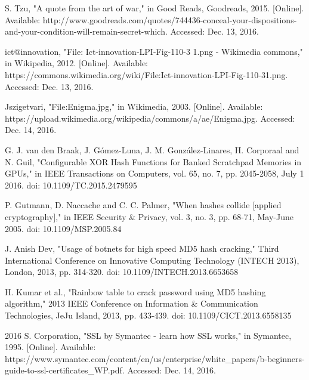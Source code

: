 \documentclass[journal]{IEEEtran}
\begin{document}
%
%
%
\begin{thebibliography}{1}


S. Tzu, "A quote from the art of war," in Good Reads, Goodreads, 2015. [Online]. Available: http://www.goodreads.com/quotes/744436-conceal-your-dispositions-and-your-condition-will-remain-secret-which. Accessed: Dec. 13, 2016.

ict@innovation, "File: Ict-innovation-LPI-Fig-110-3 1.png - Wikimedia commons," in Wikipedia, 2012. [Online]. Available: https://commons.wikimedia.org/wiki/File:Ict-innovation-LPI-Fig-110-31.png. Accessed: Dec. 13, 2016.

Jszigetvari, "File:Enigma.jpg," in Wikimedia, 2003. [Online]. Available: https://upload.wikimedia.org/wikipedia/commons/a/ae/Enigma.jpg. Accessed: Dec. 14, 2016.

G. J. van den Braak, J. Gómez-Luna, J. M. González-Linares, H. Corporaal and N. Guil, "Configurable XOR Hash Functions for Banked Scratchpad Memories in GPUs," in IEEE Transactions on Computers, vol. 65, no. 7, pp. 2045-2058, July 1 2016.
doi: 10.1109/TC.2015.2479595

P. Gutmann, D. Naccache and C. C. Palmer, "When hashes collide [applied cryptography]," in IEEE Security \& Privacy, vol. 3, no. 3, pp. 68-71, May-June 2005.
doi: 10.1109/MSP.2005.84

J. Anish Dev, "Usage of botnets for high speed MD5 hash cracking," Third International Conference on Innovative Computing Technology (INTECH 2013), London, 2013, pp. 314-320.
doi: 10.1109/INTECH.2013.6653658

H. Kumar et al., "Rainbow table to crack password using MD5 hashing algorithm," 2013 IEEE Conference on Information \& Communication Technologies, JeJu Island, 2013, pp. 433-439.
doi: 10.1109/CICT.2013.6558135

2016 S. Corporation, "SSL by Symantec - learn how SSL works," in Symantec, 1995. [Online]. Available: https://www.symantec.com/content/en/us/enterprise/white\_papers/b-beginners-guide-to-ssl-certificates\_WP.pdf. Accessed: Dec. 14, 2016.


\end{thebibliography}
\end{document}
